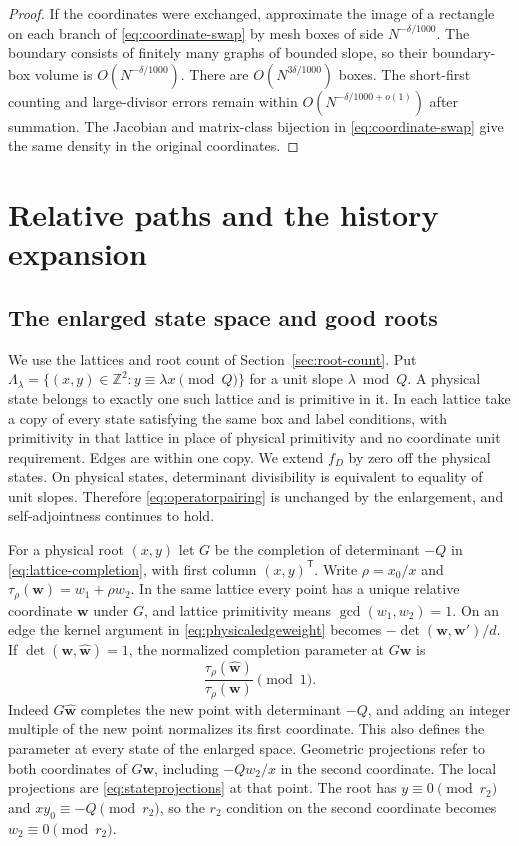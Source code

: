 \documentclass[11pt]{amsart}
\numberwithin{equation}{section}
\theoremstyle{remark}
\begin{document}
\begin{proof}
If the coordinates were exchanged, approximate the image of a
rectangle on each branch of \eqref{eq:coordinate-swap} by mesh boxes
of side $N^{-\delta/1000}$. The boundary consists of finitely many
graphs of bounded slope, so their boundary-box volume is
$O(N^{-\delta/1000})$. There are $O(N^{3\delta/1000})$ boxes.
The short-first counting and large-divisor errors remain within
$O(N^{-\delta/1000+o(1)})$ after summation. The Jacobian and matrix-class
bijection in \eqref{eq:coordinate-swap} give the same density in the
original coordinates.
\end{proof}

\section{Relative paths and the history expansion}\label{sec:history}

\subsection{The enlarged state space and good roots}

We use the lattices and root count of Section~\ref{sec:root-count}.
Put $\Lambda_\lambda=\{(x,y)\in\mathbb Z^2:y\equiv\lambda x\pmod Q\}$
for a unit slope $\lambda\bmod Q$. A physical state belongs to exactly
one such lattice and is primitive in it. In each lattice take a copy
of every state satisfying the same box and label conditions, with
primitivity in that lattice in place of physical primitivity and no
coordinate unit requirement. Edges are within one copy. We extend
$f_D$ by zero off the physical states. On physical states, determinant
divisibility is equivalent to equality of unit slopes. Therefore
\eqref{eq:operatorpairing} is unchanged by the enlargement, and
self-adjointness continues to hold.

For a physical root $(x,y)$ let $G$ be the completion of determinant
$-Q$ in \eqref{eq:lattice-completion}, with first column $(x,y)^{\mathsf T}$.
Write $\rho=x_0/x$ and $\tau_\rho(\mathbf w)=w_1+\rho w_2$. In the
same lattice every point has a unique relative coordinate $\mathbf w$
under $G$, and lattice primitivity means $\gcd(w_1,w_2)=1$.
On an edge the kernel argument in \eqref{eq:physicaledgeweight} becomes
$-\det(\mathbf w,\mathbf w')/d$. If
$\det(\mathbf w,\widehat{\mathbf w})=1$, the normalized completion
parameter at $G\mathbf w$ is
\begin{equation}\label{eq:rhotransfer}
 \frac{\tau_\rho(\widehat{\mathbf w})}{\tau_\rho(\mathbf w)}\pmod1.
\end{equation}
Indeed $G\widehat{\mathbf w}$ completes the new point with determinant
$-Q$, and adding an integer multiple of the new point normalizes its
first coordinate. This also defines the parameter at every state of
the enlarged space. Geometric projections refer to both coordinates
of $G\mathbf w$, including $-Qw_2/x$ in the second coordinate. The
local projections are \eqref{eq:stateprojections} at that point. The
root has $y\equiv0\pmod{r_2}$ and $xy_0\equiv-Q\pmod{r_2}$, so the
$r_2$ condition on the second coordinate becomes $w_2\equiv0\pmod{r_2}$.
\end{document}
